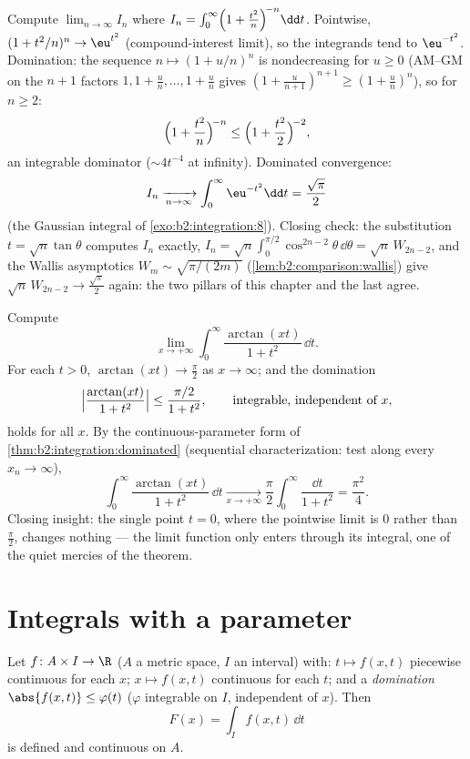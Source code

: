 \begin{example}\label{ex:b2:integration:wallislimit}
Compute $\displaystyle\lim_{n\to\infty} I_n$ where $I_n =
\int_0^\infty \Bigl(1 + \frac{t^2}{n}\Bigr)^{\!-n}\dd t$.
Pointwise, $(1 + t^2/n)^n \to \eu^{t^2}$ (compound-interest
limit), so the integrands tend to $\eu^{-t^2}$. Domination: the
sequence $n \mapsto (1 + u/n)^n$ is nondecreasing for $u \geq 0$
(AM--GM on the $n + 1$ factors $1, 1 + \frac un, \dots, 1 +
\frac un$ gives $(1 + \frac u{n+1})^{n+1} \geq (1 + \frac
un)^n$), so for $n \geq 2$:
\[
\Bigl(1 + \frac{t^2}{n}\Bigr)^{\!-n}
\leq \Bigl(1 + \frac{t^2}{2}\Bigr)^{\!-2},
\]
an integrable dominator ($\sim 4t^{-4}$ at infinity). Dominated
convergence:
\[
I_n \xrightarrow[n\to\infty]{} \int_0^\infty \eu^{-t^2}\dd t
= \frac{\sqrt\pi}{2}
\]
(the Gaussian integral of \cref{exo:b2:integration:8}). Closing
check: the substitution $t = \sqrt n\tan\theta$ computes $I_n$
exactly, $I_n = \sqrt n\int_0^{\pi/2}\cos^{2n-2}\theta\,\dd\theta
= \sqrt n\,W_{2n-2}$, and the Wallis asymptotics $W_m \sim
\sqrt{\pi/(2m)}$ (\cref{lem:b2:comparison:wallis}) give $\sqrt
n\,W_{2n-2} \to \frac{\sqrt\pi}2$ again: the two pillars of this
chapter and the last agree.
\end{example}

\begin{example}
\label{ex:b2:integration:arctanlimit}
Compute
\[
\lim_{x\to+\infty}\int_0^\infty
\frac{\arctan(xt)}{1+t^2}\,\dd t .
\]
For each $t > 0$,
$\arctan(xt) \to \frac\pi2$ as $x \to \infty$; and the
domination
\[
\Bigl|\frac{\arctan(xt)}{1+t^2}\Bigr|
\leq \frac{\pi/2}{1+t^2},
\qquad\text{integrable, independent of } x,
\]
holds for all $x$. By the continuous-parameter form of
\cref{thm:b2:integration:dominated} (sequential
characterization: test along every $x_n \to \infty$),
\[
\int_0^\infty\frac{\arctan(xt)}{1+t^2}\,\dd t
\xrightarrow[x\to+\infty]{}
\frac\pi2\int_0^\infty\frac{\dd t}{1+t^2}
= \frac{\pi^2}{4} .
\]
Closing insight: the single point $t = 0$, where the pointwise
limit is $0$ rather than $\frac\pi2$, changes nothing --- the
limit function only enters through its integral, one of the
quiet mercies of the theorem.
\end{example}

\section{Integrals with a parameter}

\begin{theorem}\label{thm:b2:integration:continuity}
Let $f \colon A \times I \to \R$ ($A$ a metric space, $I$ an
interval) with: $t \mapsto f(x, t)$ piecewise continuous for each
$x$; $x \mapsto f(x, t)$ continuous for each $t$; and a
\emph{domination} $\abs{f(x,t)} \leq \varphi(t)$ ($\varphi$
integrable on $I$, independent of $x$). Then
\[
F(x) = \int_I f(x, t)\,\dd t
\]
is defined and continuous on $A$.
\end{theorem}

